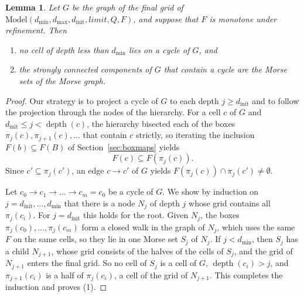 \documentclass[11pt]{article}
\theoremstyle{plain}
\newtheorem{lemma}[proposition]{Lemma}
\theoremstyle{definition}
\theoremstyle{remark}
\DeclareMathOperator{\depth}{depth}
\newcommand{\dmin}{d_{\min}}
\newcommand{\dmax}{d_{\max}}
\newcommand{\dinit}{d_{\mathrm{init}}}
\begin{document}
\begin{lemma}\label{lem:monotone}
Let $G$ be the graph of the final grid of $\mathrm{Model}(\dmin,\dmax,\dinit,\mathit{limit},Q,F)$, and suppose that $F$ is monotone under refinement. Then
\begin{enumerate}[label=(\arabic*)]
\item no cell of depth less than $\dmin$ lies on a cycle of $G$, and
\item the strongly connected components of $G$ that contain a cycle are the Morse sets of the Morse graph.
\end{enumerate}
\end{lemma}

\begin{proof}
Our strategy is to project a cycle of $G$ to each depth $j\geq\dinit$ and to follow the projection through the nodes of the hierarchy. For a cell $c$ of $G$ and $\dinit\leq j<\depth(c)$, the hierarchy bisected each of the boxes $\pi_j(c),\pi_{j+1}(c),\dots$ that contain $c$ strictly, so iterating the inclusion $F(b)\subseteq F(B)$ of Section~\ref{sec:boxmaps} yields
\[
F(c)\subseteq F(\pi_j(c)).
\]
Since $c'\subseteq\pi_j(c')$, an edge $c\to c'$ of $G$ yields $F(\pi_j(c))\cap\pi_j(c')\neq\emptyset$.

Let $c_0\to c_1\to\dots\to c_m=c_0$ be a cycle of $G$. We show by induction on $j=\dinit,\dots,\dmin$ that there is a node $N_j$ of depth $j$ whose grid contains all $\pi_j(c_i)$. For $j=\dinit$ this holds for the root. Given $N_j$, the boxes $\pi_j(c_0),\dots,\pi_j(c_m)$ form a closed walk in the graph of $N_j$, which uses the same $F$ on the same cells, so they lie in one Morse set $S_j$ of $N_j$. If $j<\dmin$, then $S_j$ has a child $N_{j+1}$, whose grid consists of the halves of the cells of $S_j$, and the grid of $N_{j+1}$ enters the final grid. So no cell of $S_j$ is a cell of $G$, $\depth(c_i)>j$, and $\pi_{j+1}(c_i)$ is a half of $\pi_j(c_i)$, a cell of the grid of $N_{j+1}$. This completes the induction and proves (1).


\end{proof}
\end{document}
